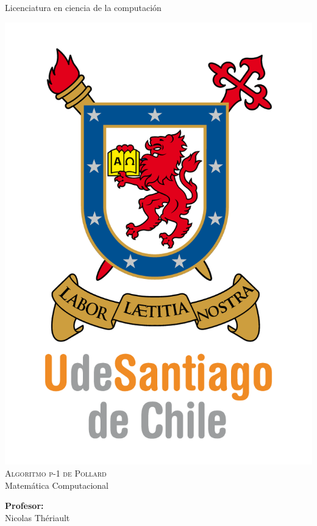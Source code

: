 \documentclass[12pt,letterpaper]{scrartcl}
\author{Don cuyi}
\begin{document}
\begin{titlepage}

\begin{center}

{\Large { Licenciatura en ciencia de la computación} }

\includegraphics[scale=1]{UDSCNRJ}
\\[1cm]

{\Huge \textsc{Algoritmo p-1 de Pollard}}\\[0.7cm]

{\huge  Matemática Computacional}\\[2cm]


\begin{minipage}[l]{0.4\textwidth}
	\begin{flushleft}
	\linespread{1}
		\textbf{\textsf{Profesor:}}\\
		\large Nicolas Thériault
	\end{flushleft}
\end{minipage}
\begin{minipage}[l]{0.4\textwidth}


\end{minipage}
\end{center}
\end{titlepage}
\end{document}
